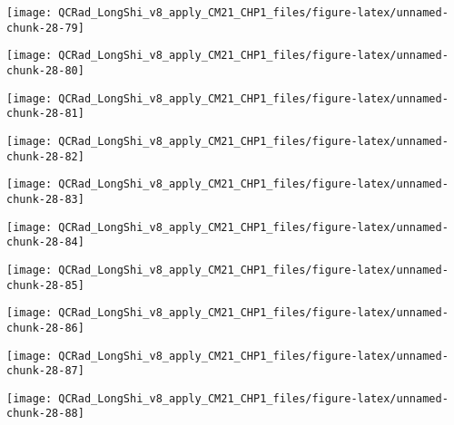 \documentclass[
  10pt,
  a4paper,oneside]{article}
\begin{document}
\begin{center}\texttt{[image: QCRad\_LongShi\_v8\_apply\_CM21\_CHP1\_files/figure-latex/unnamed-chunk-28-79]} \end{center}

\begin{center}\texttt{[image: QCRad\_LongShi\_v8\_apply\_CM21\_CHP1\_files/figure-latex/unnamed-chunk-28-80]} \end{center}

\begin{center}\texttt{[image: QCRad\_LongShi\_v8\_apply\_CM21\_CHP1\_files/figure-latex/unnamed-chunk-28-81]} \end{center}

\begin{center}\texttt{[image: QCRad\_LongShi\_v8\_apply\_CM21\_CHP1\_files/figure-latex/unnamed-chunk-28-82]} \end{center}

\begin{center}\texttt{[image: QCRad\_LongShi\_v8\_apply\_CM21\_CHP1\_files/figure-latex/unnamed-chunk-28-83]} \end{center}

\begin{center}\texttt{[image: QCRad\_LongShi\_v8\_apply\_CM21\_CHP1\_files/figure-latex/unnamed-chunk-28-84]} \end{center}

\begin{center}\texttt{[image: QCRad\_LongShi\_v8\_apply\_CM21\_CHP1\_files/figure-latex/unnamed-chunk-28-85]} \end{center}

\begin{center}\texttt{[image: QCRad\_LongShi\_v8\_apply\_CM21\_CHP1\_files/figure-latex/unnamed-chunk-28-86]} \end{center}

\begin{center}\texttt{[image: QCRad\_LongShi\_v8\_apply\_CM21\_CHP1\_files/figure-latex/unnamed-chunk-28-87]} \end{center}

\begin{center}\texttt{[image: QCRad\_LongShi\_v8\_apply\_CM21\_CHP1\_files/figure-latex/unnamed-chunk-28-88]} \end{center}
\end{document}
